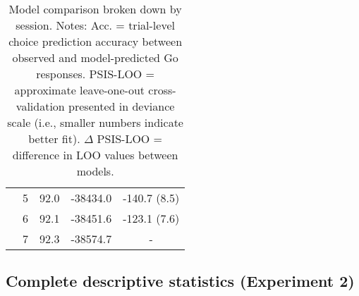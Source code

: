 \documentclass[a4paper,12pt]{article}
\begin{document}
\begin{refsection}[supp]
\begin{table}[h!]
\begin{tabular}{lcccr}
         & 5 & 92.0 & -38434.0 & -140.7 (8.5) \\
         & 6 & 92.1 & -38451.6 & -123.1 (7.6) \\
         & 7 & 92.3 & -38574.7 & \multicolumn{1}{c}{-} \\
         \bottomrule
    \end{tabular}
    \caption{Model comparison broken down by session. Notes: Acc. = trial-level choice prediction accuracy between observed and model-predicted Go responses. PSIS-LOO = approximate leave-one-out cross-validation presented in deviance scale (i.e., smaller numbers indicate better fit). \break $\Delta$ PSIS-LOO = difference in LOO values between models.}
    \label{tab:exp1_mc_full}
\end{table}

\clearpage
\subsection*{Complete descriptive statistics (Experiment 2)}


\end{refsection}
\end{document}

